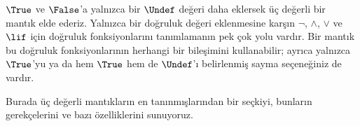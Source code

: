 



$\True$ ve $\False$'a yalnızca bir $\Undef$ değeri daha eklersek üç değerli
bir mantık elde ederiz. Yalnızca bir doğruluk değeri eklenmesine karşın
$\lnot$, $\land$, $\lor$ ve $\lif$ için doğruluk fonksiyonlarını
tanımlamanın pek çok yolu vardır. Bir mantık bu doğruluk fonksiyonlarının
herhangi bir bileşimini kullanabilir; ayrıca yalnızca $\True$'yu ya da hem
$\True$ hem de $\Undef$'ı belirlenmiş sayma seçeneğiniz de vardır.

Burada üç değerli mantıkların en tanınmışlarından bir seçkiyi, bunların
gerekçelerini ve bazı özelliklerini sunuyoruz.

